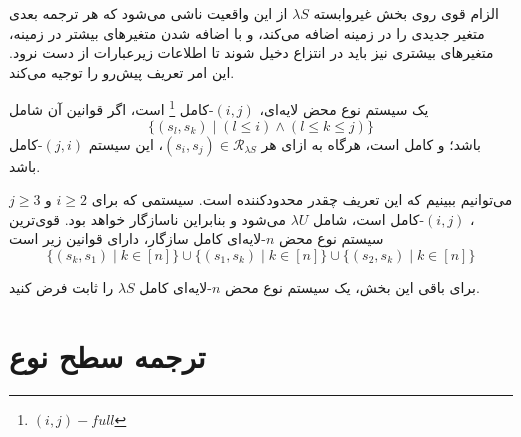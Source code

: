الزام قوی روی بخش غیروابسته
$\lambda S$
از این واقعیت ناشی می‌شود که هر ترجمه بعدی متغیر جدیدی را در زمینه اضافه می‌کند، و با اضافه شدن متغیرهای بیشتر در زمینه، متغیرهای بیشتری نیز باید در انتزاع دخیل شوند تا اطلاعات زیرعبارات از دست نرود. این امر تعریف پیش‌رو را توجیه می‌کند.
\begin{defn}
یک سیستم نوع محض لایه‌ای،
$(i,j)$-کامل \footnote{$(i,j)-full$}
است، اگر قوانین آن شامل
\begin{equation*}
\{(s_l,s_k) \mid (l \le i) \land (l \le k \le j)\}
\end{equation*}
باشد؛ و کامل است، هرگاه به ازای هر
$(s_i,s_j) \in \mathcal{R}_{\lambda S}$،
این سیستم
$(j,i)$-کامل باشد.
\end{defn}

می‌توانیم ببینیم که این تعریف چقدر محدودکننده است. سیستمی که برای
$i \ge 2$
و
$j \ge 3$،
$(i,j)$-کامل است،
شامل
$\lambda U$ می‌شود و بنابراین ناسازگار خواهد بود.
قوی‌ترین سیستم نوع محض $n$-لایه‌ای کامل سازگار، دارای قوانین زیر است
\begin{equation*}
\{(s_k,s_1) \mid k \in [n]\} \cup \{(s_1,s_k) \mid k \in [n]\} \cup \{(s_2,s_k) \mid k \in [n]\}
\end{equation*}

برای باقی این بخش، یک سیستم نوع محض $n$-لایه‌ای کامل $\lambda S$ را ثابت فرض کنید.

\section{ترجمه سطح نوع}

